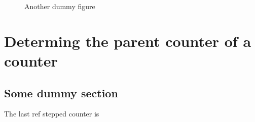 \documentclass{book}
\newcommand{\showfullresetlist}[1]{%
\item Counter name: #1 \hfill \csname the#1\endcsname%
}
\begin{document}
\begin{itemize}
\end{itemize}

\begin{figure}
\caption{Another dummy figure}
\end{figure}

\GetAllResetLists

\chapter[Parent counter of another counter]{Determing the parent counter of a counter}

\section{Some dummy section}

The last ref stepped counter is \LastRefSteppedCounter

\fbox{\GetParentCounter{\LastRefSteppedCounter}}


\GetAllResetLists
\noindent{}
\end{document}
